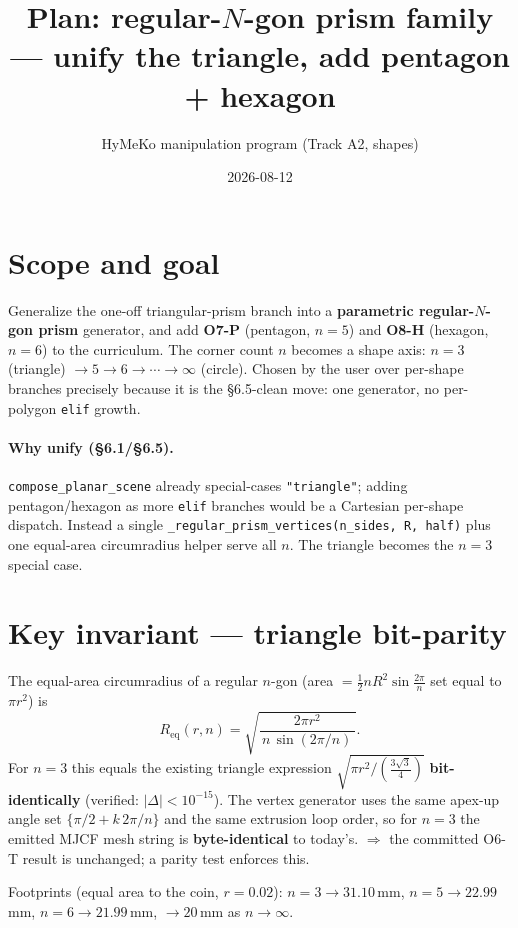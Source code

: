\documentclass[11pt]{article}
\title{Plan: regular-$N$-gon prism family --- unify the triangle, add pentagon + hexagon}
\author{HyMeKo manipulation program (Track A2, shapes)}
\date{2026-08-12}
\begin{document}
\maketitle

\section{Scope and goal}
Generalize the one-off triangular-prism branch into a \textbf{parametric regular-$N$-gon prism}
generator, and add \textbf{O7-P} (pentagon, $n=5$) and \textbf{O8-H} (hexagon, $n=6$) to the
curriculum. The corner count $n$ becomes a shape axis: $n=3$ (triangle) $\to 5 \to 6 \to \cdots \to
\infty$ (circle). Chosen by the user over per-shape branches precisely because it is the
\S6.5-clean move: one generator, no per-polygon \texttt{elif} growth.

\paragraph{Why unify (\S6.1/\S6.5).} \texttt{compose\_planar\_scene} already special-cases
\texttt{"triangle"}; adding pentagon/hexagon as more \texttt{elif} branches would be a Cartesian
per-shape dispatch. Instead a single \texttt{\_regular\_prism\_vertices(n\_sides, R, half)} plus one
equal-area circumradius helper serve all $n$. The triangle becomes the $n=3$ special case.

\section{Key invariant --- triangle bit-parity}
The equal-area circumradius of a regular $n$-gon (area $=\tfrac12 n R^2\sin\tfrac{2\pi}{n}$ set equal
to $\pi r^2$) is
\[
  R_{\mathrm{eq}}(r,n)=\sqrt{\dfrac{2\pi r^2}{\,n\,\sin(2\pi/n)\,}}.
\]
For $n=3$ this equals the existing triangle expression $\sqrt{\pi r^2/(\tfrac{3\sqrt3}{4})}$
\textbf{bit-identically} (verified: $|\Delta|<10^{-15}$). The vertex generator uses the same apex-up
angle set $\{\pi/2 + k\,2\pi/n\}$ and the same extrusion loop order, so for $n=3$ the emitted MJCF
mesh string is \textbf{byte-identical} to today's. $\Rightarrow$ the committed O6-T result is
unchanged; a parity test enforces this.

Footprints (equal area to the coin, $r=0.02$): $n{=}3\to31.10$\,mm, $n{=}5\to22.99$\,mm,
$n{=}6\to21.99$\,mm, $\to 20$\,mm as $n\to\infty$.
\end{document}

